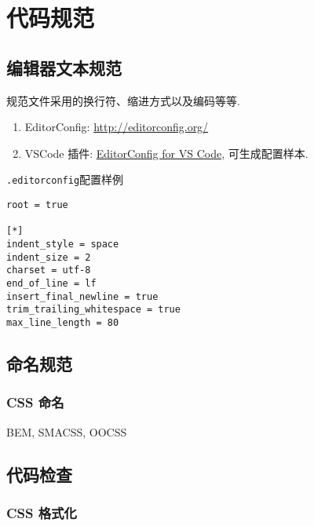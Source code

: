 \section{代码规范}\label{ux4ee3ux7801ux89c4ux8303}

\subsection{编辑器文本规范}\label{ux7f16ux8f91ux5668ux6587ux672cux89c4ux8303}

规范文件采用的换行符、缩进方式以及编码等等.

\begin{enumerate}
\def\labelenumi{\arabic{enumi}.}
\tightlist
\item
  EditorConfig: \url{http://editorconfig.org/}
\item
  VSCode 插件:
  \href{https://marketplace.visualstudio.com/items?itemName=EditorConfig.EditorConfig}{EditorConfig
  for VS Code}, 可生成配置样本.
\end{enumerate}

\lstinline!.editorconfig!配置样例

\begin{lstlisting}
root = true

[*]
indent_style = space
indent_size = 2
charset = utf-8
end_of_line = lf
insert_final_newline = true
trim_trailing_whitespace = true
max_line_length = 80
\end{lstlisting}

\subsection{命名规范}\label{ux547dux540dux89c4ux8303}

\subsubsection{CSS 命名}\label{css-ux547dux540d}

BEM, SMACSS, OOCSS

\subsection{代码检查}\label{ux4ee3ux7801ux68c0ux67e5}

\subsubsection{CSS 格式化}\label{css-ux683cux5f0fux5316}

